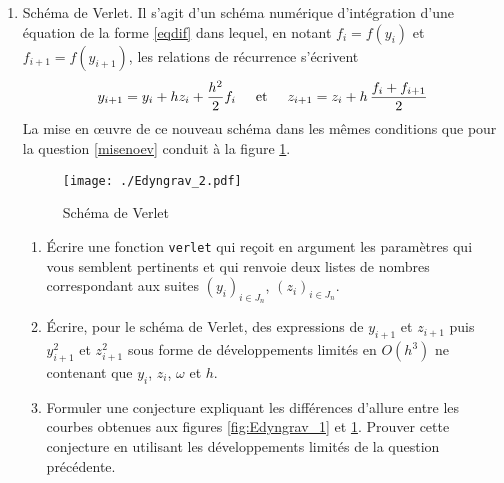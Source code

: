 \begin{enumerate}
\item Schéma de Verlet. Il s'agit d'un schéma numérique d'intégration d'une équation de la forme \ref{eqdif} dans lequel, en notant $f_i=f(y_i)$ et $f_{i+1}=f(y_{i+1})$, les relations de récurrence s'écrivent
\begin{displaymath}
  y_{i+1} = y_{i} + hz_i + \frac{h^2}{2} f_i\hspace{0.5cm}\text{et}\hspace{0.5cm} z_{i+1} = z_i + h\,\frac{f_i + f_{i+1}}{2}
\end{displaymath}
La mise en \oe{}uvre de ce nouveau schéma dans les mêmes conditions que pour la question \ref{misenoev} conduit à la figure \ref{fig:Edyngrav_2}.
\begin{figure}[h]
  \centering
  \texttt{[image: ./Edyngrav\_2.pdf]}
  \caption{Schéma de Verlet}
  \label{fig:Edyngrav_2}
\end{figure}
\begin{enumerate}
  \item \'Ecrire une fonction \texttt{verlet} qui reçoit en argument les paramètres qui vous semblent pertinents et qui renvoie deux listes de nombres correspondant aux suites $\left(y_i \right)_{i\in J_n}$, $\left(z_i \right)_{i\in J_n}$.
  \item \'Ecrire, pour le schéma de Verlet, des expressions de $y_{i+1}$ et $z_{i+1}$ puis $y_{i+1}^2$ et $z_{i+1}^2$ sous forme de développements limités en $O(h^3)$ ne contenant que $y_i$, $z_i$, $\omega$ et $h$.
  \item Formuler une conjecture expliquant les différences d'allure entre les courbes obtenues aux figures \ref{fig:Edyngrav_1} et \ref{fig:Edyngrav_2}. Prouver cette conjecture en utilisant les développements limités de la question précédente. 
\end{enumerate}
\end{enumerate}

